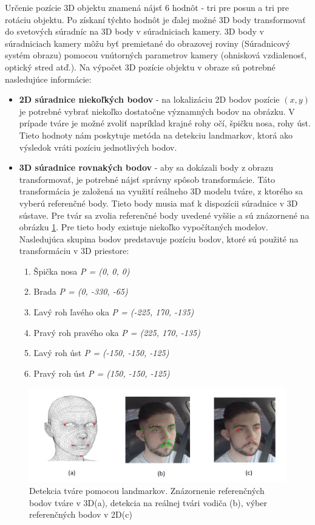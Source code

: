 \documentclass[slovak,master,dept460,male,cpp,cpdeclaration]{diploma}
\begin{document}
Určenie pozície 3D objektu znamená nájsť 6 hodnôt  - tri pre posun a tri pre rotáciu objektu. Po získaní týchto hodnôt je ďalej možné 3D body transformovať do svetových súradníc na 3D body v súradniciach kamery. 3D body v súradniciach kamery môžu byť premietané do obrazovej roviny (Súradnicový systém obrazu) pomocou vnútorných parametrov kamery (ohnisková vzdialenosť, optický stred atď.). Na výpočet 3D pozície objektu v obraze sú potrebné nasledujúce informácie:
\begin{itemize}
\item\textbf{2D súradnice niekoľkých bodov} - na lokalizáciu 2D bodov pozície  $(x, y )$ je potrebné vybrať niekoľko dostatočne významných bodov na obrázku. V prípade tváre je možné zvoliť napríklad krajné rohy očí, špičku nosa, rohy úst. Tieto hodnoty nám poskytuje metóda na detekciu landmarkov, ktorá ako výsledok vráti pozíciu jednotlivých bodov.
\item\textbf{3D súradnice rovnakých bodov}  - aby sa dokázali body z obrazu transformovať, je potrebné nájsť správny spôsob transformácie. Táto transformácia je založená na využití reálneho 3D modelu tváre, z ktorého  sa vyberú referenčné body. Tieto body musia mať k dispozícii súradnice v 3D sústave. Pre tvár sa zvolia referenčné body uvedené vyššie a sú znázornené na obrázku \ref{fig:landmarkPoints}. Pre tieto body existuje niekoľko  vypočítaných modelov. Nasledujúca skupina bodov predstavuje pozíciu bodov, ktoré sú použité  na transformáciu v 3D priestore:
\begin{enumerate}
  \item Špička nosa \textit{P = (0, 0, 0)}
  \item Brada \textit{P = (0, -330, -65)}
  \item Ľavý roh ľavého oka \textit{P = (-225, 170, -135)}
  \item Pravý roh pravého oka \textit{P = (225, 170, -135)}
  \item Ľavý roh úst \textit{P = (-150, -150, -125)}
  \item Pravý roh úst \textit{P = (150, -150, -125)}
\end{enumerate}
\end{itemize}

\begin{figure}[H]
	\centering
	\includegraphics[width=1\textwidth]{Figures/landmarkPoints.png}
	\caption{Detekcia tváre pomocou landmarkov. Znázornenie referenčných bodov tváre v 3D(a), detekcia na reálnej tvári vodiča (b), výber referenčných bodov v 2D(c)}
	\label{fig:landmarkPoints}
\end{figure}
\end{document}
